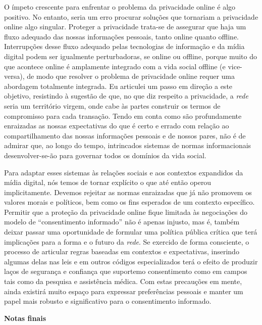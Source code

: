 O ímpeto crescente para enfrentar o problema da privacidade online é
algo positivo. No entanto, seria um erro procurar soluções que tornariam
a privacidade online algo singular. Proteger a privacidade trata-se de
assegurar que haja um fluxo adequado das nossas informações pessoais,
tanto online quanto offline. Interrupções desse fluxo adequado pelas
tecnologias de informação e da mídia digital podem ser igualmente
perturbadoras, se online ou offline, porque muito do que acontece online
é amplamente integrado com a vida social offline (e vice-versa), de modo
que resolver o problema de privacidade online requer uma abordagem
totalmente integrada. Eu articulei um passo em direção a este objetivo,
resistindo à sugestão de que, no que diz respeito a privacidade, a
\emph{rede} seria um território virgem, onde cabe às partes construir os
termos de compromisso para cada transação. Tendo em conta como são
profundamente enraizadas as nossas expectativas do que é certo e errado
com relação ao compartilhamento das nossas informações pessoais e de
nossos pares, não é de admirar que, ao longo do tempo, intrincados
sistemas de normas informacionais desenvolver-se-ão para governar todos
os domínios da vida social.

Para adaptar esses sistemas às relações sociais e aos contextos
expandidos da mídia digital, nós temos de tornar explícito o que até
então operou implicitamente. Devemos rejeitar as normas enraizadas que
já não promovem os valores morais e políticos, bem como os fins
esperados de um contexto específico. Permitir que a proteção da
privacidade online fique limitada às negociações do modelo de
``consentimento informado'' não é apenas injusto, mas é, também deixar
passar uma oportunidade de formular uma política pública crítica que
terá implicações para a forma e o futuro da \emph{rede}. Se exercido de
forma consciente, o processo de articular regras baseadas em contextos e
expectativas, inserindo algumas delas nas leis e em outros códigos
especializados terá o efeito de produzir laços de segurança e confiança
que suportemo consentimento como em campos tais como da pesquisa e
assistência médica. Com estas precauções em mente, ainda existirá muito
espaço para expressar preferências pessoais e manter um papel mais
robusto e significativo para o consentimento informado.

\textbf{Notas finais}

